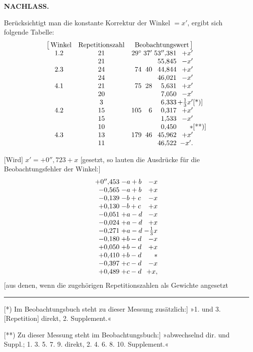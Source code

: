\par\clearpage
\noindent{}\hfill{\small\textbf{NACHLASS.}}\hfill\null\par\medskip

Berücksichtigt man die konstante Korrektur der Winkel \(=x'\), ergibt sich folgende Tabelle:
\[
\begin{array}{@{}c@{\quad}c@{\quad}r@{\;}r@{\;}r@{}r@{}l@{}}
 \bigl[\,\text{Winkel}&\text{Repetitionszahl}&
 \multicolumn{4}{c@{}}{\text{Beobachtungswert}\,\bigr]}&\\
 1.2&21&29^\circ&37'&53''{,}381&+x'&\\
 &21&&&55{,}845&-x'&\\
 2.3&24&74&40&44{,}844&+x'&\\
 &24&&&46{,}021&-x'&\\
 4.1&21&75&28&5{,}631&+x'&\\
 &20&&&7{,}050&-x'&\\
 &3&&&6{,}333&+\frac13x'&\text{[*)]}\\
 4.2&15&105&6&0{,}317&+x'&\\
 &15&&&1{,}533&-x'&\\
 &10&&&0{,}450&\ast&\text{[**)]}\\
 4.3&13&179&46&45{,}962&+x'&\\
 &11&&&46{,}522&-x'.&
\end{array}
\]

[Wird] \(x'=+0''{,}723+x\) [gesetzt, so lauten die Ausdrücke für die Beobachtungsfehler der Winkel:]
\[
\begin{array}{@{}r@{\;}l@{\;}r@{}}
 +0''{,}453&-a+b&-x\\
 -0{,}565&-a+b&+x\\
 -0{,}139&-b+c&-x\\
 +0{,}130&-b+c&+x\\
 -0{,}051&+a-d&-x\\
 -0{,}024&+a-d&+x\\
 -0{,}271&+a-d&-\frac13x\\
 -0{,}180&+b-d&-x\\
 +0{,}050&+b-d&+x\\
 +0{,}410&+b-d&\ast\\
 -0{,}397&+c-d&-x\\
 +0{,}489&+c-d&+x,
\end{array}
\]
\noindent [aus denen, wenn die zugehörigen Repetitionszahlen als Gewichte angesetzt

\par\noindent\rule{4cm}{.4pt}\par
{\footnotesize
\noindent\hspace*{\parindent}[*) Im Beobachtungsbuch steht zu dieser Messung zusätzlich:] »1. und 3. [Repetition] direkt, 2. Supplement.«\par
\noindent\hspace*{\parindent}[**) Zu dieser Messung steht im Beobachtungsbuch:] »abwechselnd dir. und Suppl.; 1. 3. 5. 7. 9. direkt, 2. 4. 6. 8. 10. Supplement.«\par}

